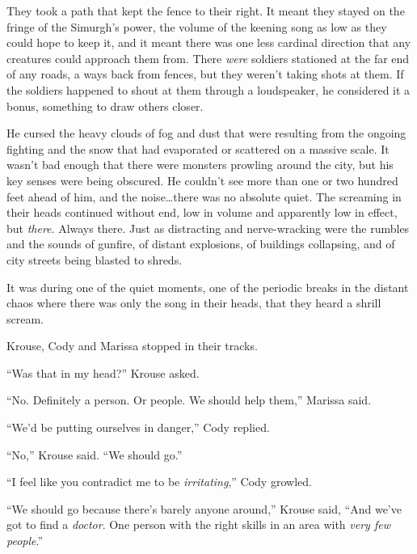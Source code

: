 





They took a path that kept the fence to their right.  It meant they stayed on the fringe of the Simurgh's power, the volume of the keening song as low as they could hope to keep it, and it meant there was one less cardinal direction that any creatures could approach them from.  There \emph{were} soldiers stationed at the far end of any roads, a ways back from fences, but they weren't taking shots at them.  If the soldiers happened to shout at them through a loudspeaker, he considered it a bonus, something to draw others closer.



He cursed the heavy clouds of fog and dust that were resulting from the ongoing fighting and the snow that had evaporated or scattered on a massive scale.  It wasn't bad enough that there were monsters prowling around the city, but his key senses were being obscured.  He couldn't see more than one or two hundred feet ahead of him, and the noise\ldots there was no absolute quiet.  The screaming in their heads continued without end, low in volume and apparently low in effect, but \emph{there}.  Always there.  Just as distracting and nerve-wracking were the rumbles and the sounds of gunfire, of distant explosions, of buildings collapsing, and of city streets being blasted to shreds.



It was during one of the quiet moments, one of the periodic breaks in the distant chaos where there was only the song in their heads, that they heard a shrill scream.



Krouse, Cody and Marissa stopped in their tracks.



``Was that in my head?'' Krouse asked.



``No.  Definitely a person.  Or people.  We should help them,'' Marissa said.



``We'd be putting ourselves in danger,'' Cody replied.



``No,'' Krouse said.  ``We should go.''



``I feel like you contradict me to be \emph{irritating},'' Cody growled.



``We should go because there's barely anyone around,'' Krouse said, ``And we've got to find a \emph{doctor}.  One person with the right skills in an area with \emph{very few people}.''



